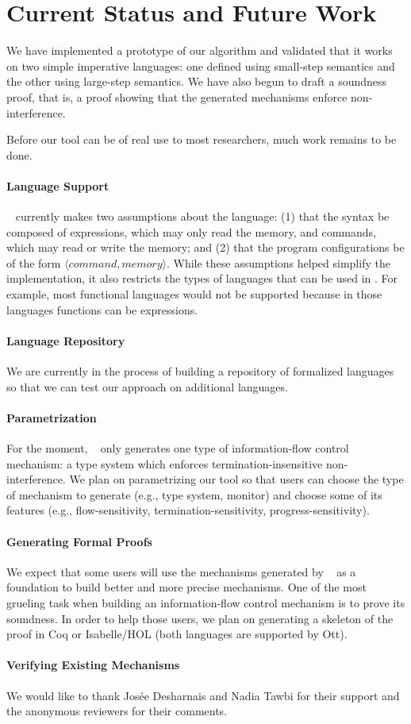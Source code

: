 \documentclass[sigplan,10pt]{acmart}\settopmatter{printfolios=true,printccs=false,printacmref=false}
\begin{document}
\section{Current Status and Future Work}
We have implemented a prototype of our algorithm and validated that it works on two simple imperative languages: one defined using small-step semantics and the other using large-step semantics. We have also begun to draft a soundness proof, that is, a proof showing that the generated mechanisms enforce non-interference.

Before our tool can be of real use to most researchers, much work remains to be done.

\paragraph{Language Support} \ottifc~ currently makes two assumptions about the language: (1) that the syntax be composed of expressions, which may only read the memory, and commands, which may read or write the memory; and (2) that the program configurations be of the form $\langle command, memory\rangle$. While these assumptions helped simplify the implementation, it also restricts the types of languages that can be used in \ottifc. For example, most functional languages would not be supported because in those languages functions can be expressions. 

\paragraph{Language Repository} We are currently in the process of building a repository of formalized languages so that we can test our approach on additional languages. 

\paragraph{Parametrization} For the moment, \ottifc~ only generates one type of information-flow control mechanism: a type system which enforces termination-insensitive non-interference. We plan on parametrizing our tool so that users can choose the type of mechanism to generate (e.g., type system, monitor) and choose some of its features (e.g., flow-sensitivity, termination-sensitivity, progress-sensitivity).

\paragraph{Generating Formal Proofs} We expect that some users will use the mechanisms generated by \ottifc~ as a foundation to build better and more precise mechanisms. One of the most grueling task when building an information-flow control mechanism is to prove its soundness. In order to help those users, we plan on generating a skeleton of the proof in Coq or Isabelle/HOL (both languages are supported by Ott).

\paragraph{Verifying Existing Mechanisms} 

\begin{acks}
We would like to thank Josée Desharnais and Nadia Tawbi for their support and the anonymous reviewers for their comments.
\end{acks}


\end{document}
